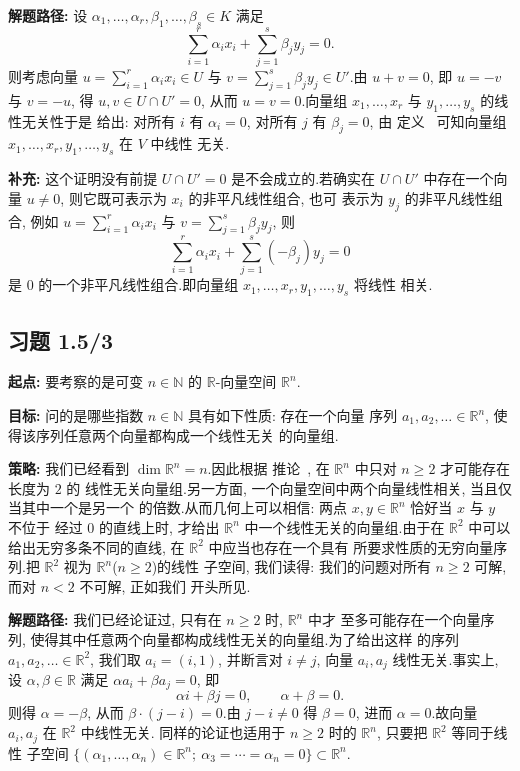 \noindent\textbf{解题路径:} 设 $\alpha_1, \ldots, \alpha_r, \beta_1, \ldots, \beta_s
\in K$ 满足
\[
\sum_{i=1}^{r} \alpha_i x_i + \sum_{j=1}^{s} \beta_j y_j = 0\text{.}
\]
则考虑向量 $u = \sum_{i=1}^{r} \alpha_i x_i \in U$ 与 $v = \sum_{j=1}^{s} \beta_j y_j
\in U'$.由 $u + v = 0$, 即 $u = -v$ 与 $v = -u$, 得 $u, v \in U \cap U' = 0$,
从而 $u = v = 0$.向量组 $x_1, \ldots, x_r$ 与 $y_1, \ldots, y_s$ 的线性无关性于是
给出: 对所有 $i$ 有 $\alpha_i = 0$, 对所有 $j$ 有 $\beta_j = 0$, 由
定义~ 可知向量组 $x_1, \ldots, x_r, y_1, \ldots, y_s$ 在 $V$ 中线性
无关.

\noindent\textbf{补充:} 这个证明没有前提 $U \cap U' = 0$ 是不会成立的.若确实在
$U \cap U'$ 中存在一个向量 $u \neq 0$, 则它既可表示为 $x_i$ 的非平凡线性组合, 也可
表示为 $y_j$ 的非平凡线性组合, 例如 $u = \sum_{i=1}^{r} \alpha_i x_i$ 与
$v = \sum_{j=1}^{s} \beta_j y_j$, 则
\[
\sum_{i=1}^{r} \alpha_i x_i + \sum_{j=1}^{s} (-\beta_j) y_j = 0
\]
是 $0$ 的一个非平凡线性组合.即向量组 $x_1, \ldots, x_r, y_1, \ldots, y_s$ 将线性
相关.

\subsection*{习题 1.5/3}

\noindent\textbf{起点:} 要考察的是可变 $n \in \mathbb{N}$ 的 $\mathbb{R}$-向量空间
$\mathbb{R}^n$.

\noindent\textbf{目标:} 问的是哪些指数 $n \in \mathbb{N}$ 具有如下性质: 存在一个向量
序列 $a_1, a_2, \ldots \in \mathbb{R}^n$, 使得该序列任意两个向量都构成一个线性无关
的向量组.

\noindent\textbf{策略:} 我们已经看到 $\dim \mathbb{R}^n = n$.因此根据
推论~, 在 $\mathbb{R}^n$ 中只对 $n \geq 2$ 才可能存在长度为 $2$ 的
线性无关向量组.另一方面, 一个向量空间中两个向量线性相关, 当且仅当其中一个是另一个
的倍数.从而几何上可以相信: 两点 $x, y \in \mathbb{R}^n$ 恰好当 $x$ 与 $y$ 不位于
经过 $0$ 的直线上时, 才给出 $\mathbb{R}^n$ 中一个线性无关的向量组.由于在
$\mathbb{R}^2$ 中可以给出无穷多条不同的直线, 在 $\mathbb{R}^2$ 中应当也存在一个具有
所要求性质的无穷向量序列.把 $\mathbb{R}^2$ 视为 $\mathbb{R}^n$($n \geq 2$)的线性
子空间, 我们读得: 我们的问题对所有 $n \geq 2$ 可解, 而对 $n < 2$ 不可解, 正如我们
开头所见.

\noindent\textbf{解题路径:} 我们已经论证过, 只有在 $n \geq 2$ 时, $\mathbb{R}^n$ 中才
至多可能存在一个向量序列, 使得其中任意两个向量都构成线性无关的向量组.为了给出这样
的序列 $a_1, a_2, \ldots \in \mathbb{R}^2$, 我们取 $a_i = (i, 1)$, 并断言对 $i \neq j$,
向量 $a_i, a_j$ 线性无关.事实上, 设 $\alpha, \beta \in \mathbb{R}$ 满足
$\alpha a_i + \beta a_j = 0$, 即
\[
\alpha i + \beta j = 0, \qquad \alpha + \beta = 0\text{.}
\]
则得 $\alpha = -\beta$, 从而 $\beta \cdot (j - i) = 0$.由 $j - i \neq 0$ 得
$\beta = 0$, 进而 $\alpha = 0$.故向量 $a_i, a_j$ 在 $\mathbb{R}^2$ 中线性无关.
同样的论证也适用于 $n \geq 2$ 时的 $\mathbb{R}^n$, 只要把 $\mathbb{R}^2$ 等同于线性
子空间 $\{ (\alpha_1, \ldots, \alpha_n) \in \mathbb{R}^n ;\ \alpha_3 = \cdots = \alpha_n
= 0 \} \subset \mathbb{R}^n$.

